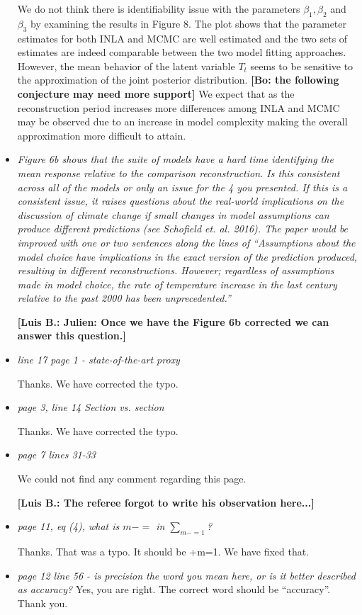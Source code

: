 \documentclass[11pt]{article}
\newcommand{\lb}[1]{\color{ForestGreen}\textbf{[Luis B.: #1]}\normalcolor}
\newcommand{\bl}[1]{\color{red}\textbf{[Bo: #1]}\normalcolor}
\begin{document}
\begin{itemize}
We do not think there is identifiability issue with the parameters
\(\beta_1,\beta_2\) and \(\beta_3\) by examining the results in Figure 8. The plot shows that the parameter estimates for both INLA and MCMC are well estimated and the two sets of estimates are indeed comparable between the two model fitting approaches.
However, the mean behavior of the latent variable
\(T_t\) seems to be sensitive to the approximation of the
joint posterior distribution. \bl{the following conjecture may need more support} We
expect that as the reconstruction period increases more
differences among INLA and MCMC may be observed due to an increase in model complexity
making the overall approximation more difficult to attain.   
  
\item \textit{Figure 6b shows that the suite of models have a hard time identifying
    the mean response relative to the comparison reconstruction. Is this
    consistent across all of the models or only an issue for the 4 you
    presented. If this is a consistent issue, it raises questions about the
    real-world implications on the discussion of climate change if small changes
    in model assumptions can produce different predictions (see Schofield et.
    al. 2016). The paper would be improved with one or two sentences along the
    lines of ``Assumptions about the model choice have implications in the exact
    version of the prediction produced, resulting in different reconstructions.
    However; regardless of assumptions made in model choice, the rate of
    temperature increase in the last century relative to the past 2000 has been unprecedented.''}

\lb{Julien: Once we have the Figure 6b corrected we can answer this question.}  
  
\item \textit{line 17 page 1 - state-of-the-art proxy}

Thanks. We have corrected the typo.
  
\item \textit{page 3, line 14 Section vs. section}

  Thanks. We have corrected the typo.
  
\item \textit{page 7 lines 31-33}

We could not find any comment regarding this page. 

  \lb{The referee forgot to write his observation here...}
  
\item \textit{page 11, eq (4), what is \(m-=\) in \(\sum_{m-=1}\)?}

  Thanks. That was a typo. It should be \sum+{m=1}. We have fixed that. 
  
\item \textit{page 12 line 56 - is precision the word you mean here, or is it
    better described as accuracy?}
  Yes, you are right. The correct word should be ``accuracy''. Thank you. 
\end{itemize}

%
%
\end{document}
